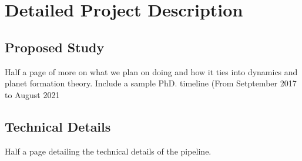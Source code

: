 \section{Detailed Project Description}
\subsection{Proposed Study}
Half a page of more on what we plan on doing and how it ties into dynamics and planet formation theory. Include a sample PhD. timeline (From Setptember 2017 to August 2021 
\subsection{Technical Details}
Half a page detailing the technical details of the pipeline.
